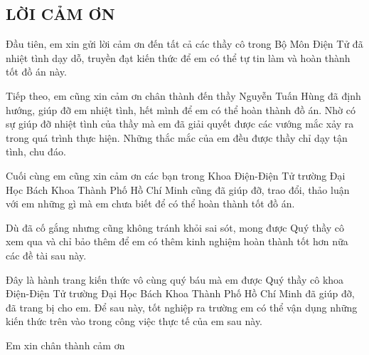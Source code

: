 \documentclass[a4paper]{article}
\numberwithin{figure}{section}
\begin{document}
\newpage
\begin{center}
    \section*{LỜI CẢM ƠN}
\end{center}

\hspace{1cm}Đầu tiên, em xin gửi lời cảm ơn đến tất cả các thầy cô trong Bộ Môn Điện Tử đã nhiệt tình dạy dỗ, truyền đạt kiến thức để em có thể tự tin làm và hoàn thành tốt đồ án này.

\hspace{1cm}Tiếp theo, em cũng xin cảm ơn chân thành đến thầy Nguyễn Tuấn Hùng đã định hướng, giúp đỡ em nhiệt tình, hết mình để em có thể hoàn thành đồ án. Nhờ có sự giúp đỡ nhiệt tình của thầy mà em đã giải quyết được các vướng mắc xảy ra trong quá trình thực hiện. Những thắc mắc của em đều được thầy chỉ dạy tận tình, chu đáo.

\hspace{1cm}Cuối cùng em cũng xin cảm ơn các bạn trong Khoa Điện-Điện Tử trường Đại Học Bách Khoa Thành Phố Hồ Chí Minh cũng đã giúp đỡ, trao đổi, thảo luận với em những gì mà em chưa biết để có thể hoàn thành tốt đồ án.

\hspace{1cm}Dù đã cố gắng nhưng cũng không tránh khỏi sai sót, mong được Quý thầy cô xem qua và chỉ bảo thêm để em có thêm kinh nghiệm hoàn thành tốt hơn nữa các đề tài sau này. 

\hspace{1cm}Đây là hành trang kiến thức vô cùng quý báu mà em được Quý thầy cô khoa Điện-Điện Tử trường Đại Học Bách Khoa Thành Phố Hồ Chí Minh đã giúp đỡ, đã trang bị cho em. Để sau này, tốt nghiệp ra trường em có thể vận dụng những kiến thức trên vào trong công việc thực tế của em sau này.

\hspace{1cm}Em xin chân thành cảm ơn


\newpage
\tableofcontents

\newpage
\listoffigures

\newpage
\listoftables

\newpage

\newpage

\newpage

\newpage

\newpage
\end{document}
